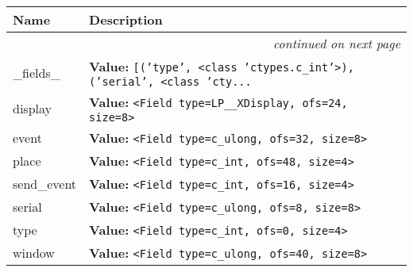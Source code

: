     \vspace{-1cm}
\hspace{\varindent}\begin{longtable}{|p{\varnamewidth}|p{\vardescrwidth}|l}
\cline{1-2}
\cline{1-2} \centering \textbf{Name} & \centering \textbf{Description}& \\
\cline{1-2}
\endhead\cline{1-2}\multicolumn{3}{r}{\small\textit{continued on next page}}\\\endfoot\cline{1-2}
\endlastfoot\raggedright \_\-f\-i\-e\-l\-d\-s\-\_\- & \raggedright \textbf{Value:} 
{\tt \texttt{[}\texttt{(}\texttt{'}\texttt{type}\texttt{'}\texttt{, }{\textless}class 'ctypes.c\_int'{\textgreater}\texttt{)}\texttt{, }\texttt{(}\texttt{'}\texttt{serial}\texttt{'}\texttt{, }{\textless}class 'cty\texttt{...}}&\\
\cline{1-2}
\raggedright d\-i\-s\-p\-l\-a\-y\- & \raggedright \textbf{Value:} 
{\tt {\textless}Field type=LP\_\_XDisplay, ofs=24, size=8{\textgreater}}&\\
\cline{1-2}
\raggedright e\-v\-e\-n\-t\- & \raggedright \textbf{Value:} 
{\tt {\textless}Field type=c\_ulong, ofs=32, size=8{\textgreater}}&\\
\cline{1-2}
\raggedright p\-l\-a\-c\-e\- & \raggedright \textbf{Value:} 
{\tt {\textless}Field type=c\_int, ofs=48, size=4{\textgreater}}&\\
\cline{1-2}
\raggedright s\-e\-n\-d\-\_\-e\-v\-e\-n\-t\- & \raggedright \textbf{Value:} 
{\tt {\textless}Field type=c\_int, ofs=16, size=4{\textgreater}}&\\
\cline{1-2}
\raggedright s\-e\-r\-i\-a\-l\- & \raggedright \textbf{Value:} 
{\tt {\textless}Field type=c\_ulong, ofs=8, size=8{\textgreater}}&\\
\cline{1-2}
\raggedright t\-y\-p\-e\- & \raggedright \textbf{Value:} 
{\tt {\textless}Field type=c\_int, ofs=0, size=4{\textgreater}}&\\
\cline{1-2}
\raggedright w\-i\-n\-d\-o\-w\- & \raggedright \textbf{Value:} 
{\tt {\textless}Field type=c\_ulong, ofs=40, size=8{\textgreater}}&\\
\cline{1-2}
\end{longtable}



